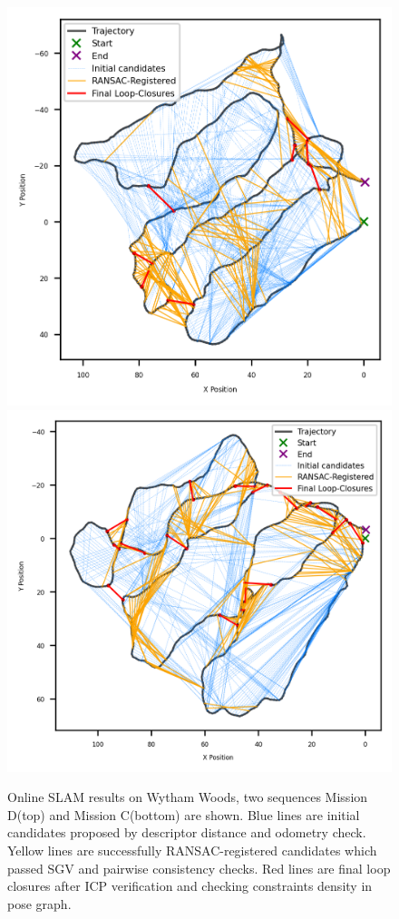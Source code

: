 \begin{figure}[htbp]
  \centering
  \includegraphics[width=0.72\columnwidth]{pics/exp_2_1_wytham_D.png}
  \includegraphics[width=0.72\columnwidth]{pics/exp_2_1_wytham_C.png}
  \caption{Online SLAM results on Wytham Woods, two sequences Mission D(top) and Mission C(bottom) are shown. Blue lines are initial candidates proposed by descriptor distance and odometry check. Yellow lines are successfully RANSAC-registered candidates which passed SGV and pairwise consistency checks. Red lines are final loop closures after ICP verification and checking constraints density in pose graph.}
  \label{fig:exp_2_1_ewytham_online}
\end{figure}


